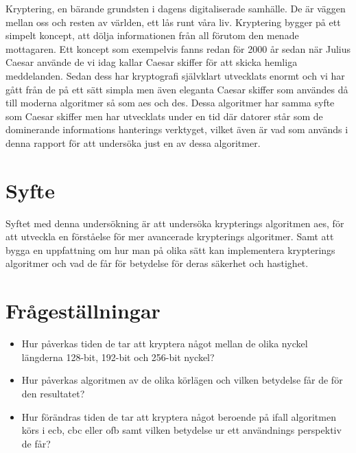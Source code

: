 
Kryptering, en bärande grundsten i dagens digitaliserade samhälle. De är väggen mellan oss och resten
av världen, ett lås runt våra liv. Kryptering bygger på ett simpelt koncept, att dölja informationen
från all förutom den menade mottagaren. Ett koncept som exempelvis fanns redan för 2000 år sedan när Julius
Caesar använde de vi idag kallar Caesar skiffer för att skicka hemliga meddelanden.
Sedan dess har kryptografi självklart utvecklats enormt och vi har gått från de på ett sätt simpla men
även eleganta Caesar skiffer som användes då till moderna algoritmer så som \acrlong{aes} och \acrlong{des}.
Dessa algoritmer har samma syfte som Caesar skiffer men har utvecklats under en tid där datorer står som
de dominerande informations hanterings verktyget, vilket även är vad som används i denna rapport för att
undersöka just en av dessa algoritmer.

\section{Syfte} %
Syftet med denna undersökning är att undersöka krypterings algoritmen \acrshort{aes},
för att utveckla en förståelse för mer avancerade krypterings algoritmer.
Samt att bygga en uppfattning om hur man på olika sätt kan implementera
krypterings algoritmer och vad de får för betydelse för deras säkerhet och
hastighet.

\section{Frågeställningar} %
\begin{itemize}
    \setlength{\itemindent}{-1em}
    \item Hur påverkas tiden de tar att kryptera något mellan de olika nyckel längderna 128-bit,
          192-bit och 256-bit nyckel?

    \item Hur påverkas algoritmen av de olika körlägen och vilken betydelse får de för den resultatet?

    \item Hur förändras tiden de tar att kryptera något beroende på ifall algoritmen körs i
          \acrshort{ecb}, \acrshort{cbc} eller \acrshort{ofb} samt vilken betydelse ur ett
          användnings perspektiv de får?
\end{itemize}

